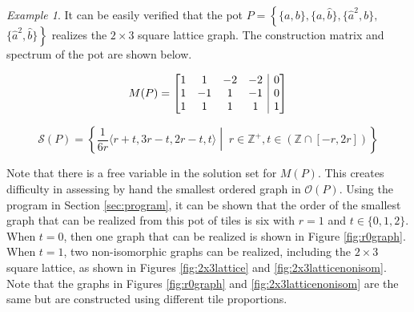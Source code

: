 \documentclass{elsarticle}
\makeatletter
\theoremstyle{definition}
\theoremstyle{remark}
\newtheorem{example}[theorem]{Example}
\theoremstyle{plain}
\theoremstyle{plain}
\newenvironment{amatrix}[1]{%
  \left[\begin{array}{@{}*{#1}{c}|c@{}}
}{%
  \end{array}\right]
}
\makeatother
\begin{document}
\begin{example}\label{limits_of_matrix_ex}
It can be easily verified that the pot $P = \left\{ \{a,b\}, \{a,\hat{b}\}, \{\hat{a}^2,b\}, \right.$ $\left.\{\hat{a}^2,\hat{b}\}\right\}$ realizes the $2 \times 3$ square lattice graph. The construction matrix and spectrum of the pot are shown below.

\begin{equation}
    M(P)=\begin{amatrix}{4} 1 & 1 & -2 & -2 & 0 \\ 1 & -1 &1 &-1 & 0\\1 & 1 & 1 & 1 & 1  \end{amatrix}
\end{equation}


\begin{equation} \mathcal{S}(P) = \left\{ \frac{1}{6r} \langle r+t, 3r-t, 2r-t, t \rangle \middle| \; r \in \mathbb{Z}^+,  t \in \left(\mathbb{Z}\cap [-r,2r]\right) \right\} \end{equation}

 Note that there is a free variable in the solution set for $M(P)$. This creates difficulty in assessing by hand the smallest ordered graph in $\mathcal{O}(P)$. Using the program in Section \ref{sec:program}, it can be shown that the order of the smallest graph that can be realized from this pot of tiles is six with $r=1$ and $t \in \{ 0, 1, 2\}$. When $t = 0$, then one graph that can be realized is shown in Figure \ref{fig:r0graph}. When $t = 1$, two non-isomorphic graphs can be realized, including the $2 \times 3$ square lattice, as shown in Figures \ref{fig:2x3lattice} and \ref{fig:2x3latticenonisom}. Note that the graphs in Figures \ref{fig:r0graph} and \ref{fig:2x3latticenonisom} are the same but are constructed using different tile proportions.

\begin{figure}  \centering
{}
\end{figure}
\end{example}
\end{document}
